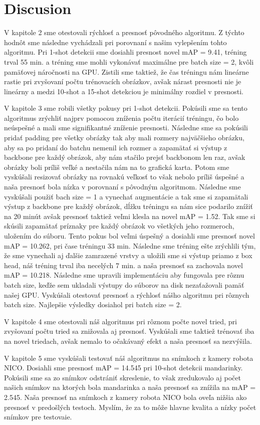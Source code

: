 \chapter*{Discusion}\label{chap:discusion}
V kapitole 2 sme otestovali rýchlosť a presnosť pôvodného algoritmu. Z týchto hodnôt sme následne vychádzali pri porovnaní s našim vylepšením tohto algoritmu. Pri 1-shot detekcii sme dosiahli presnost novel mAP = 9.41, tréning trval 55 min. a tréning sme mohli vykonávať maximálne pre batch size = 2, kvôli pamäťovej náročnosti na GPU. Zistili sme taktiež, že čas tréningu nám lineárne rastie pri zvyšovaní počtu trénovacích obrázkov, avšak nárast presnosti nie je lineárny a medzi 10-shot a 15-shot detekciou je minimálny rozdiel v presnosti.  


V kapitole 3 sme robili všetky pokusy pri 1-shot detekcii. Pokúsili sme sa tento algoritmus zrýchliť najprv pomocou zníženia počtu iterácií tréningu, čo bolo neúspešné a mali sme signifikantné zníženie presnosti. Následne sme sa pokúsili pridať padding pre všetky obrázky tak aby mali rozmery najväčšieho obrázku, aby sa po pridaní do batchu nemenil ich rozmer a zapamätať si výstup z backbone pre každý obrázok, aby nám stačilo prejsť backbonom len raz, avšak obrázky boli príliš veľké a nestačila nám na to grafická karta. Potom sme vyskúšali resizovať obrázky na rovnakú veľkosť to však nebolo príliš úspešné a naša presnosť bola nízka v porovnaní s pôvodným algoritmom. Následne sme vyskúšali použiť bach size = 1 a vynechať augmentácie a tak sme si zapamätali výstup z backbone pre každý obrázok, dĺžku tréningu sa nám sice podarilo znížiť na 20 minút avšak presnosť taktiež veľmi klesla na novel mAP = 1.52. Tak sme si skúsili zapamätať príznaky pre každý obrázok vo všetkých jeho rozmeroch, uložením do súboru. Tento pokus bol veľmi úspešný a dosiahli sme presnosť novel mAP = 10.262, pri čase tréningu 33 min. Následne sme tréning ešte zrýchlili tým, že sme vynechali aj ďalšie zamrazené vrstvy a uložili sme si výstup priamo z box head, náš tréning trval iba necelých 7 min. a naša presnosť sa zachovala novel mAP = 10.218. Následne sme upravili implementáciu aby fungovala pre rôznu batch size, keďže sem ukladali výstupy do súborov na disk nezaťažovali pamäť našej GPU. Vyskúšali otestovať presnosť a rýchlosť nášho algoritmu pri rôznych batch size. Najlepšie výsledky dosiahol pri batch size = 2. 

V kapitole 4 sme otestovali náš algoritmus pri rôznom počte novel tried, pri zvyšovaní počtu tried sa znižovala aj presnosť. Vyskúšali sme taktiež trénovať iba na novel triedach, avšak nemalo to očakávaný efekt a naša presnosť sa nezvýšila.

V kapitole 5 sme vyskúšali testovať náš algoritmus na snímkoch z kamery robota NICO. Dosiahli sme presnosť mAP = 14.545 pri 10-shot detekcii mandarinky. Pokúsili sme sa zo snímkov odstrániť skreslenie, to však zredukovalo aj počet našich snímkov na ktorých bola mandarinka a naša presnosť sa znížila na mAP = 2.545. Naša presnosť na snímkoch z kamery robota NICO bola oveľa nižšia ako presnosť v predošlých testoch. Myslím, že za to môže hlavne kvalita a nízky počet snímkov pre testovaie.